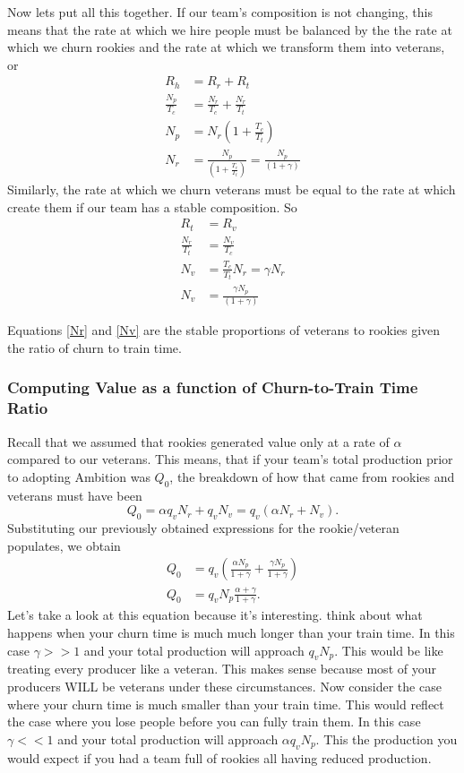 \documentclass[paper=a4, fontsize=11pt abstract]{scrartcl}
\numberwithin{equation}{section}		%
\numberwithin{figure}{section}			%
\numberwithin{table}{section}				%
\begin{document}
Now lets put all this together.  If our team's composition is not changing, this means that the rate at which we hire people must be balanced by the the rate at which we churn rookies and the rate at which we transform them into veterans, or
\begin{align}
    R_h &= R_r + R_t \\
    \frac{N_p}{T_c} &= \frac{N_r}{T_c} + \frac{N_r}{T_t} \\
    N_p &= N_r\left(1 + \frac{T_c}{T_t}\right) \\
    N_r &= \frac{N_p}{\left(1 + \frac{T_c}{T_t}\right)} = \frac{N_p}{\left(1 + \gamma\right)} \label{Nr}
\end{align}
Similarly, the rate at which we churn veterans must be equal to the rate at which create them if our team has a stable composition.  So
\begin{align}
    R_t &= R_v \\
    \frac{N_r}{T_t} &= \frac{N_v}{T_c} \\
    N_v &= \frac{T_c}{T_t}N_r = \gamma N_r \\
    N_v &= \frac{\gamma N_p}{\left(1 + \gamma\right)} \label{Nv}
\end{align}

Equations \ref{Nr} and \ref{Nv} are the stable proportions of veterans to rookies given the ratio of churn to train time.

\subsubsection{Computing Value as a function of Churn-to-Train Time Ratio}
Recall that we assumed that rookies generated value only at a rate of $\alpha$ compared to our veterans.  This means, that if your team's total production prior to adopting Ambition was $Q_0$, the breakdown of how that came from rookies and veterans must have been
\begin{equation}
    Q_0 = \alpha q_{v} N_r + q_{v} N_v = q_{v}\left(\alpha N_r + N_v\right).
\end{equation}
Substituting our previously obtained expressions for the rookie/veteran populates, we obtain
\begin{align}
    Q_0 &= q_{v}\left(\frac{\alpha N_p}{1 + \gamma} + \frac{\gamma N_p}{1 + \gamma}\right)  \\
    Q_0 &= q_{v} N_p\frac{\alpha + \gamma}{1 + \gamma} \label{Q0}.
\end{align}
Let's take a look at this equation because it's interesting.  think about what happens when your churn time is much much longer than your train time.  In this case $\gamma >> 1$ and your total production will approach $q_{v}N_p$. This would be like treating every producer like a veteran.  This makes sense because most of your producers WILL be veterans under these circumstances.  Now consider the case where your churn time is much smaller than your train time.  This would reflect the case where you lose people before you can fully train them.  In this case $\gamma << 1$ and your total production will approach $\alpha q_{v} N_p$.  This the production you would expect if you had a team full of rookies all having reduced production.
\end{document}
